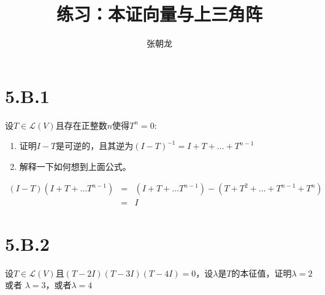 \documentclass[10pt,a4paper,UTF8]{article}
\author{张朝龙}
\date{}
\title{练习：本证向量与上三角阵}
\begin{document}
\maketitle
\tableofcontents
{}

\section{5.B.1}
\label{sec:orgd09a881}


\begin{problem}
设\(T\in \mathcal{L}(V)\)且存在正整数\(n\)使得\(T^{n} = 0\):
\begin{enumerate}
\item 证明\(I-T\)是可逆的，且其逆为\((I-T)^{-1} = I + T + \ldots + T^{n-1}\)
\item 解释一下如何想到上面公式。
\end{enumerate}
\end{problem}

\begin{answer}
\begin{eqnarray}
\label{eq:1}
(I-T)(I + T + \ldots T^{n-1})&=&(I + T + \ldots T^{n-1}) - (T +T^{2} + \ldots +T^{n-1} + T^{n} )  \\
&=& I
\end{eqnarray}
\end{answer}
\section{5.B.2}
\label{sec:orgdd6d2e6}


\begin{problem}
设\(T\in \mathcal{L}(V)\)且\((T-2I)(T-3I)(T-4I) = 0\)，设\(\lambda\)是\(T\)的本征值，证明\(\lambda= 2\) 或者 \(\lambda = 3\)，或者\(\lambda = 4\)
\end{problem}
\end{document}
